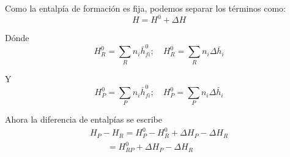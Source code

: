Como la entalpía de formación es fija, podemos separar los términos como:
\begin{equation*}
    H = H^0 + \Delta H
\end{equation*}
\par Dónde
\begin{equation*}
    H^0_{R} = \sum_R n_i \bar h^0_{fi} ; \quad H^0_{R} = \sum_R n_i \Delta \bar h_{i}
\end{equation*}
\par Y
\begin{equation*}
    H^0_{P} = \sum_P n_i \bar h^0_{fi} ; \quad H^0_{P} = \sum_P n_i \Delta \bar h_{i}
\end{equation*}
\par Ahora la diferencia de entalpías se escribe
\begin{gather*}
    H_P - H_R = H^0_P - H^0_R + \Delta H_P - \Delta H_R \\
    \quad \quad = H^0_{RP} + \Delta H_P - \Delta H_R
\end{gather*}

